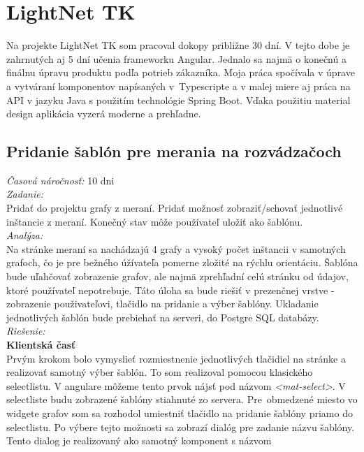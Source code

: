 \documentclass[11pt, oneside]{report}
\begin{document}
\section{LightNet TK}
Na projekte LightNet TK som pracoval dokopy približne  30 dní. V tejto dobe  je zahrnutých aj 5 dní učenia frameworku Angular. Jednalo sa najmä o konečnú a finálnu úpravu produktu podľa potrieb zákazníka. Moja práca spočívala v úprave a vytváraní  komponentov napísaných v~Typescripte a v malej miere aj práca na API  v jazyku Java s použitím technológie Spring Boot. Vďaka použitiu material design aplikácia vyzerá moderne a prehľadne.
\subsection{Pridanie šablón pre merania na rozvádzačoch }
\textit{Časová náročnosť:} 10 dni\\
\textit{Zadanie:}\\
Pridať do projektu grafy  z meraní. Pridať možnosť zobraziť/schovať jednotlivé inštancie  z meraní. Konečný stav môže používateľ uložiť ako šablónu.
\\\textit{Analýza:}\\
Na stránke meraní sa nachádzajú 4 grafy  a vysoký počet inštancii v samotných grafoch, čo  je pre bežného úžívateľa pomerne zložité na rýchlu orientáciu. 
Šablóna bude uľahčovať zobrazenie grafov, ale najmä zprehľadní celú stránku od  údajov, ktoré používateľ nepotrebuje. Táto úloha sa bude riešiť v prezenčnej vrstve - zobrazenie použivateľovi, tlačidlo na pridanie a výber šablóny. Ukladanie jednotlivých šablón bude prebiehať  na serveri, do Postgre SQL databázy.
\newpage
\textit{Riešenie:}\\
\textbf{Klientská časť}\\
Prvým krokom bolo vymyslieť rozmiestnenie jednotlivých  tlačidiel na stránke a realizovať samotný výber šablón. To som realizoval pomocou klasického selectlistu. V angulare môžeme tento  prvok nájsť pod názvom 
\textit{<mat-select>}. V selectliste budu zobrazené šablóny stiahnuté zo servera. Pre~obmedzené miesto vo widgete grafov som sa rozhodol umiestniť tlačidlo na pridanie šablóny priamo do selectlistu. Po výbere tejto možnosti sa zobrazí dialóg pre zadanie názvu šablóny. Tento dialog je realizovaný ako samotný komponent s názvom 
\end{document}
